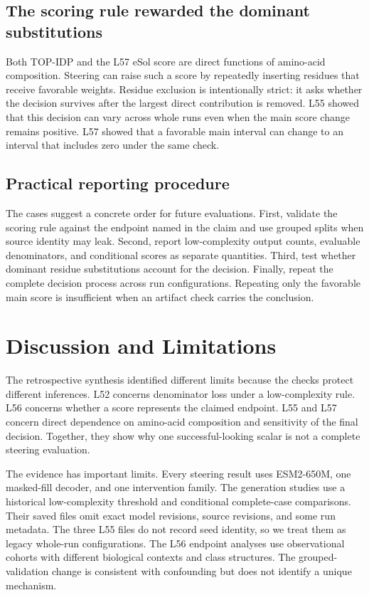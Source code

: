 \documentclass{article}
\begin{document}
\subsection{The scoring rule rewarded the dominant substitutions}

Both TOP-IDP and the L57 eSol score are direct functions of amino-acid
composition. Steering can raise such a score by repeatedly inserting residues
that receive favorable weights. Residue exclusion is intentionally strict: it
asks whether the decision survives after the largest direct contribution is
removed. L55 showed that this decision can vary across whole runs even when
the main score change remains positive. L57 showed that a favorable main
interval can change to an interval that includes zero under the same check.

\subsection{Practical reporting procedure}

The cases suggest a concrete order for future evaluations. First, validate
the scoring rule against the endpoint named in the claim and use grouped
splits when source identity may leak. Second, report low-complexity output
counts, evaluable denominators, and conditional scores as separate quantities.
Third, test whether dominant residue substitutions account for the decision.
Finally, repeat the complete decision process across run configurations.
Repeating only the favorable main score is insufficient when an artifact check
carries the conclusion.

\section{Discussion and Limitations}
\label{sec:limitations}

The retrospective synthesis identified different limits because the checks
protect different inferences. L52 concerns denominator loss under a
low-complexity rule. L56 concerns whether a score represents the claimed
endpoint. L55 and L57 concern direct dependence on amino-acid composition and
sensitivity of the final decision. Together, they show why one
successful-looking scalar is not a complete steering evaluation.

The evidence has important limits. Every steering result uses ESM2-650M, one
masked-fill decoder, and one intervention family. The generation studies use
a historical low-complexity threshold and conditional complete-case
comparisons. Their saved files omit exact model revisions, source revisions,
and some run metadata. The three L55 files do not record seed identity, so we
treat them as legacy whole-run configurations. The L56 endpoint analyses use
observational cohorts with different biological contexts and class
structures. The grouped-validation change is consistent with confounding but
does not identify a unique mechanism.
\end{document}
